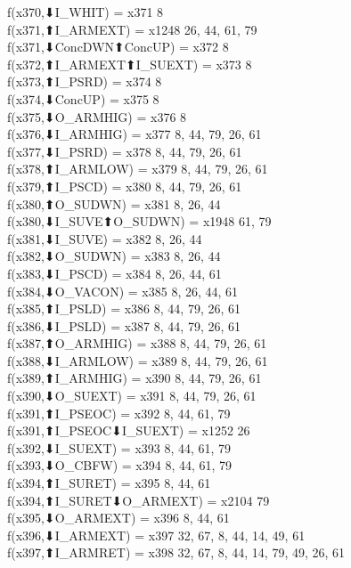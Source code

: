 f(x370,⬇I_WHIT) = x371 {8} \\
f(x371,⬆I_ARMEXT) = x1248 {26, 44, 61, 79} \\
f(x371,⬇ConcDWN⬆ConcUP) = x372 {8} \\
f(x372,⬆I_ARMEXT⬆I_SUEXT) = x373 {8} \\
f(x373,⬆I_PSRD) = x374 {8} \\
f(x374,⬇ConcUP) = x375 {8} \\
f(x375,⬇O_ARMHIG) = x376 {8} \\
f(x376,⬇I_ARMHIG) = x377 {8, 44, 79, 26, 61} \\
f(x377,⬇I_PSRD) = x378 {8, 44, 79, 26, 61} \\
f(x378,⬆I_ARMLOW) = x379 {8, 44, 79, 26, 61} \\
f(x379,⬆I_PSCD) = x380 {8, 44, 79, 26, 61} \\
f(x380,⬆O_SUDWN) = x381 {8, 26, 44} \\
f(x380,⬇I_SUVE⬆O_SUDWN) = x1948 {61, 79} \\
f(x381,⬇I_SUVE) = x382 {8, 26, 44} \\
f(x382,⬇O_SUDWN) = x383 {8, 26, 44} \\
f(x383,⬇I_PSCD) = x384 {8, 26, 44, 61} \\
f(x384,⬇O_VACON) = x385 {8, 26, 44, 61} \\
f(x385,⬆I_PSLD) = x386 {8, 44, 79, 26, 61} \\
f(x386,⬇I_PSLD) = x387 {8, 44, 79, 26, 61} \\
f(x387,⬆O_ARMHIG) = x388 {8, 44, 79, 26, 61} \\
f(x388,⬇I_ARMLOW) = x389 {8, 44, 79, 26, 61} \\
f(x389,⬆I_ARMHIG) = x390 {8, 44, 79, 26, 61} \\
f(x390,⬇O_SUEXT) = x391 {8, 44, 79, 26, 61} \\
f(x391,⬆I_PSEOC) = x392 {8, 44, 61, 79} \\
f(x391,⬆I_PSEOC⬇I_SUEXT) = x1252 {26} \\
f(x392,⬇I_SUEXT) = x393 {8, 44, 61, 79} \\
f(x393,⬇O_CBFW) = x394 {8, 44, 61, 79} \\
f(x394,⬆I_SURET) = x395 {8, 44, 61} \\
f(x394,⬆I_SURET⬇O_ARMEXT) = x2104 {79} \\
f(x395,⬇O_ARMEXT) = x396 {8, 44, 61} \\
f(x396,⬇I_ARMEXT) = x397 {32, 67, 8, 44, 14, 49, 61} \\
f(x397,⬆I_ARMRET) = x398 {32, 67, 8, 44, 14, 79, 49, 26, 61} \\
